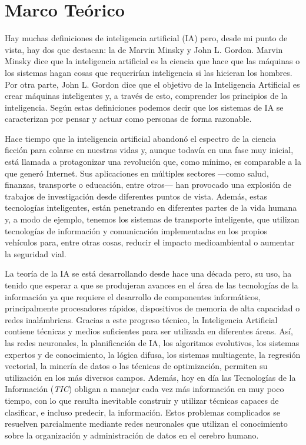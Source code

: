 
\chapter{Marco Teórico}
\label{marcoteorico}


Hay muchas definiciones de inteligencia artificial (IA) pero, desde mi punto de vista, hay dos que destacan: la de Marvin Minsky y John L. Gordon. Marvin Minsky dice que la inteligencia artificial es la ciencia que hace que las máquinas o los sistemas hagan cosas que requerirían inteligencia si las hicieran los hombres. Por otra parte, John L. Gordon dice que el objetivo de la Inteligencia Artificial es crear máquinas inteligentes y, a través de esto, comprender los principios de la inteligencia. Según estas definiciones podemos decir que los sistemas de IA se caracterizan por pensar y actuar como personas de forma razonable.


Hace tiempo que la inteligencia artificial abandonó el espectro de la ciencia ficción para colarse en nuestras vidas y, aunque todavía en una fase muy inicial, está llamada a protagonizar una revolución que, como mínimo, es comparable a la que generó Internet. Sus aplicaciones en múltiples sectores —como salud, finanzas, transporte o educación, entre otros— han provocado una explosión de trabajos de investigación desde diferentes puntos de vista. Además, estas tecnologías inteligentes, están penetrando en diferentes partes de la vida humana y, a modo de ejemplo, tenemos los sistemas de transporte inteligente, que utilizan tecnologías de información y comunicación implementadas en los propios vehículos para, entre otras cosas, reducir el impacto medioambiental o aumentar la seguridad vial.


La teoría de la IA se está desarrollando desde hace una década pero, su uso, ha tenido que esperar a que se produjeran avances en el área de las tecnologías de la información ya que requiere el desarrollo de componentes informáticos, principalmente procesadores rápidos, dispositivos de memoria de alta capacidad o redes inalámbricas. Gracias a este progreso técnico, la Inteligencia Artificial contiene técnicas y medios suficientes para ser utilizada en diferentes áreas. Así, las redes neuronales, la planificación de IA, los algoritmos evolutivos, los sistemas expertos y de conocimiento, la lógica difusa, los sistemas multiagente, la regresión vectorial, la minería de datos o las técnicas de optimización, permiten su utilización en los más diversos campos. Además, hoy en día las Tecnologías de la Información (\textit{TIC}) obligan a manejar cada vez más información en muy poco tiempo, con lo que resulta inevitable construir y utilizar técnicas capaces de clasificar, e incluso predecir, la información. Estos problemas complicados se resuelven parcialmente mediante redes neuronales que utilizan el conocimiento sobre la
organización y administración de datos en el cerebro humano.


